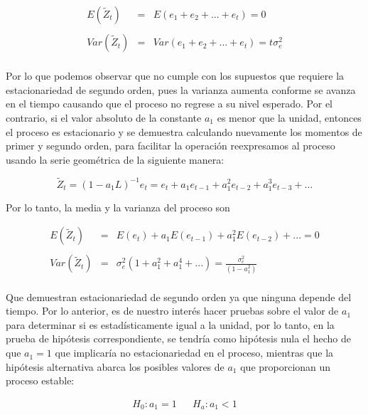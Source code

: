  \begin{eqnarray}
 E(\tilde{Z}_t) &  =&   E(e_1+ e_2+...+e_t)= 0 \nonumber  \\ 
         &  &    \\
         Var(\tilde{Z}_t) & =& Var(e_1+e_2+...+e_t)=t \sigma_e^2  \nonumber \\
 & &  \nonumber 
\end{eqnarray} 


Por lo que podemos observar que no cumple con los supuestos que requiere la estacionariedad de segundo orden, pues la varianza aumenta conforme se avanza en el tiempo causando que el proceso no regrese a su nivel esperado. Por el contrario, si el valor absoluto de la constante $a_1$ es menor que la unidad, entonces el proceso es estacionario y se demuestra calculando nuevamente los momentos de primer y segundo orden, para facilitar la operación reexpresamos al proceso usando la serie geométrica de la siguiente manera:

\begin{equation}\label{eq:AR_MA}
\tilde{Z}_t=(1-a_1L)^{-1}e_t=e_t+a_1e_{t-1}+a_1^2e_{t-2}+ a_1^3e_{t-3}+...
\end{equation} 

Por lo tanto, la media y la varianza del proceso son

 \begin{eqnarray}
 E(\tilde{Z}_t) &  =&  E(e_t) + a_1E(e_{t-1})+ a_1^2E(e_{t-2})+...= 0 \nonumber  \\ 
         &  &    \\
         Var(\tilde{Z}_t) & =& \sigma^2_e (1+a_1^2+ a_1^4+ ...)= \frac{\sigma_e^2}{(1-a_1^2)}  \nonumber \\
 & &  \nonumber 
\end{eqnarray}

Que demuestran estacionariedad de segundo orden ya que ninguna depende del tiempo. Por lo anterior, es de nuestro interés hacer pruebas sobre el valor de $a_1$ para determinar si es estadísticamente igual a la unidad, por lo tanto, en la prueba de hipótesis correspondiente, se tendría como hipótesis nula el hecho de que $a_1=1$ que implicaría no estacionariedad en el proceso, mientras que la hipótesis alternativa abarca los posibles valores de $a_1$ que proporcionan un proceso estable:

   \begin{eqnarray}
    H_0: a_1=1 &  &  H_a: a_1 <1   \\ 
    \nonumber 
   \end{eqnarray} 

